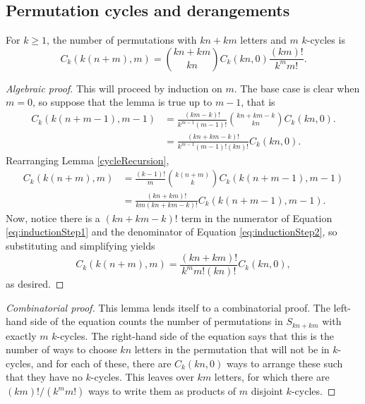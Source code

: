 \subsection{Permutation cycles and derangements}
\begin{lemma}
  \label{CIdentity}
  For $k \geq 1$, the number of permutations with $kn + km$ letters and
  $m$ $k$-cycles is
  \begin{equation}
    C_k(k(n + m), m) = \binom{kn+km}{kn}C_k(kn,0)\frac{(km)!}{k^mm!}.
  \end{equation}
\end{lemma}
\begin{proof}[Algebraic proof]
  This will proceed by induction on $m$. The base case is clear when $m=0$,
  so suppose that the lemma is true up to $m-1$, that is \begin{align}
    C_k(k(n + m - 1), m - 1)
    &=
    \frac{(km-k)!}{k^{m-1}(m-1)!}\binom{kn + km - k}{kn}C_k(kn, 0). \\
    &= \frac{(kn + km - k)!}{k^{m-1}(m-1)!(kn)!}C_k(kn, 0).
    \label{eq:inductionStep1}
  \end{align}
  Rearranging Lemma \ref{cycleRecursion}, \begin{align}
    C_k(k(n + m), m)
    &= \frac{(k-1)!}{m}\binom{k(n + m)}{k}C_k(k(n+m-1), m-1) \\
    &= \frac{(kn+km)!}{km(kn+km-k)!}C_k(k(n+m-1), m-1).
    \label{eq:inductionStep2}
  \end{align}
  Now, notice there is a $(kn + km - k)!$ term in the numerator of Equation \eqref{eq:inductionStep1} and
  the denominator of Equation \eqref{eq:inductionStep2}, so substituting and simplifying yields \begin{equation}
    C_k(k(n + m), m)
    = \frac{(kn+km)!}{k^m m!(kn)!}C_k(kn, 0),
  \end{equation}
  as desired.
\end{proof}
\begin{proof}[Combinatorial proof]
  This lemma lends itself to a combinatorial proof.
  The left-hand side of the equation counts the number of permutations in
  $S_{kn+km}$ with exactly $m$ $k$-cycles.
  The right-hand side of the equation says that this is the number of ways to
  choose $kn$ letters in the permutation that will not be in $k$-cycles,
  and for each of these, there are $C_k(kn,0)$ ways to arrange these such that
  they have no $k$-cycles.
  This leaves over $km$ letters, for which there are
  $(km)!/(k^mm!)$ ways to write them as products of $m$
  disjoint $k$-cycles.
\end{proof}
